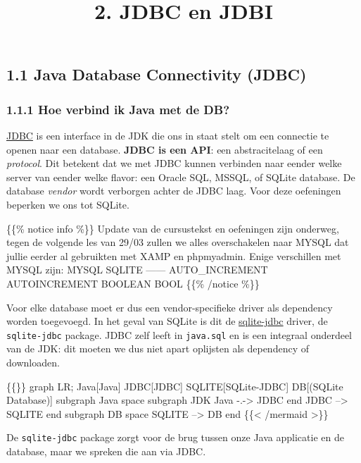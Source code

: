 \documentclass[
]{article}
\title{2. JDBC en JDBI}
\author{}
\date{}
\begin{document}
\maketitle

\subsection{1.1 Java Database Connectivity
(JDBC)}\label{java-database-connectivity-jdbc}

\subsubsection{1.1.1 Hoe verbind ik Java met de
DB?}\label{hoe-verbind-ik-java-met-de-db}

\href{https://www.tutorialspoint.com/jdbc/index.htm}{JDBC} is een
interface in de JDK die ons in staat stelt om een connectie te openen
naar een database. \textbf{JDBC is een API}: een abstracitelaag of een
\emph{protocol}. Dit betekent dat we met JDBC kunnen verbinden naar
eender welke server van eender welke flavor: een Oracle SQL, MSSQL, of
SQLite database. De database \emph{vendor} wordt verborgen achter de
JDBC laag. Voor deze oefeningen beperken we ons tot SQLite.

\{\{\% notice info \%\}\} Update van de cursustekst en oefeningen zijn
onderweg, tegen de volgende les van 29/03 zullen we alles overschakelen
naar MYSQL dat jullie eerder al gebruikten met XAMP en phpmyadmin. Enige
verschillen met MYSQL zijn: \textbar{} MYSQL \textbar{} SQLITE
\textbar{} \textbar---\textbar---\textbar{} \textbar{} AUTO\_INCREMENT
\textbar{} AUTOINCREMENT \textbar{} \textbar{} BOOLEAN \textbar{} BOOL
\textbar{} \{\{\% /notice \%\}\}

Voor elke database moet er dus een vendor-specifieke driver als
dependency worden toegevoegd. In het geval van SQLite is dit de
\href{https://github.com/xerial/sqlite-jdbc}{sqlite-jdbc} driver, de
\texttt{sqlite-jdbc} package. JDBC zelf leeft in \texttt{java.sql} en is
een integraal onderdeel van de JDK: dit moeten we dus niet apart
oplijsten als dependency of downloaden.

\{\{\}\} graph LR; Java{[}Java{]} JDBC{[}JDBC{]} SQLITE{[}SQLite-JDBC{]}
DB{[}(SQLite Database){]} subgraph Java space subgraph JDK Java
-.-\textgreater{} JDBC end JDBC --\textgreater{} SQLITE end subgraph DB
space SQLITE --\textgreater{} DB end \{\{\textless{} /mermaid
\textgreater\}\}

De \texttt{sqlite-jdbc} package zorgt voor de brug tussen onze Java
applicatie en de database, maar we spreken die aan via JDBC.
\end{document}
